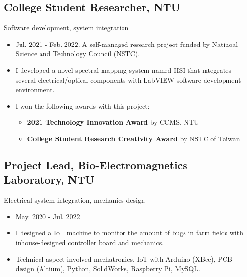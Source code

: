 \documentclass[12pt]{article}
\begin{document}
        \subsection*{College Student Researcher, NTU}
        {\sffamily
        Software development, system integration
        \begin{itemize}
            \item Jul. 2021 - Feb. 2022. A self-managed research project funded by Natinoal Science and Technology Council (NSTC).
            \item I developed a novel spectral mapping system named HSI that integrates several electrical/optical components with LabVIEW software development environment. %
            \item I won the following awards with this project: 
            \begin{itemize}
                \item \textbf{2021 Technology Innovation Award} by CCMS, NTU
                \item \textbf{College Student Research Creativity Award} by NSTC of Taiwan
            \end{itemize}
        \end{itemize}}
        \subsection*{Project Lead, Bio-Electromagnetics Laboratory, NTU}
        {\sffamily
        Electrical system integration, mechanics design
        \begin{itemize}
            \item May. 2020 - Jul. 2022
            \item I designed a IoT machine to monitor the amount of bugs in farm fields with inhouse-designed controller board and mechanics.
            \item Technical aspect involved mechatronics, IoT with Arduino (XBee), PCB design (Altium), Python, SolidWorks, Raspberry Pi, MySQL.
        \end{itemize}
        }
\end{document}
